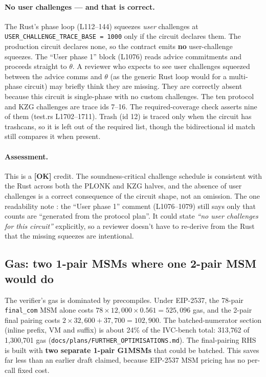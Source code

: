 \paragraph{No user challenges --- and that is correct.}
The Rust's phase loop (L112--144) squeezes \emph{user} challenges
at \texttt{USER\_\allowbreak{}CHALLENGE\_\allowbreak{}TRACE\_\allowbreak{}BASE = 1000} only if the
circuit declares them. The production circuit declares none, so
the contract emits \textbf{no} user-challenge squeezes. The
``User phase 1'' block (L1076) reads advice commitments and
proceeds straight to $\theta$. A reviewer who expects to see user
challenges squeezed between the advice comms and $\theta$ (as the
generic Rust loop would for a multi-phase circuit) may briefly
think they are missing. They are correctly absent because this
circuit is single-phase with no custom challenges. The ten
protocol and KZG challenges are trace ids 7--16. The
required-coverage check asserts nine of them
(test.rs L1702--1711). Trash (id 12) is traced only when the
circuit has trashcans, so it is left out of the required list,
though the bidirectional id match still compares it when present.

\paragraph{Assessment.} This is a
\textcolor{tracegreen}{\textbf{[OK]}} credit. The
soundness-critical challenge schedule is consistent with the Rust
across both the PLONK and KZG halves, and the absence of user
challenges is a correct consequence of the circuit shape, not an
omission. The one readability note : the
``User phase 1'' comment (L1076--1079) still says only that
counts are ``generated from the protocol plan''. It could state
\emph{``no user challenges for this circuit''} explicitly, so a
reviewer doesn't have to re-derive from the Rust that the missing
squeezes are intentional.

\subsection{Gas: two 1-pair MSMs where one 2-pair MSM would do}
\label{sec:pr-gas-msm}

The verifier's gas is dominated by precompiles. Under EIP-2537, the
78-pair \texttt{final\_com} MSM alone costs
$78\times12{,}000\times0.561=525{,}096$ gas, and the 2-pair
final pairing costs $2\times32{,}600+37{,}700=102{,}900$. The
batched-numerator section (inline prefix, VM and suffix) is about
24\% of the IVC-bench total: 313{,}762 of 1{,}300{,}701 gas
(\texttt{docs/\allowbreak{}plans/\allowbreak{}FURTHER\_\allowbreak{}OPTIMISATIONS.md}). The final-pairing
RHS is built with \textbf{two separate 1-pair G1MSMs} that could be
batched.  This saves far less than an earlier
draft claimed, because EIP-2537 MSM pricing has no per-call fixed
cost.

